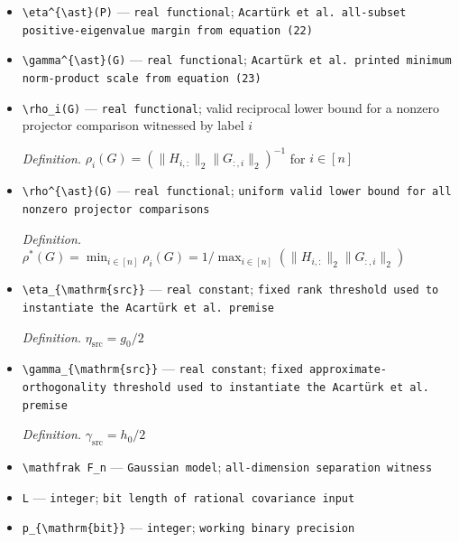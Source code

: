 \documentclass{article}
\begin{document}
\begin{itemize}
  \item \texttt{\textbackslash{}\allowbreak{}eta\textasciicircum{}\{\textbackslash{}\allowbreak{}ast\}\allowbreak{}(P)} --- \texttt{real functional}; \texttt{Acartürk et al. all-\allowbreak{}subset positive-\allowbreak{}eigenvalue margin from equation (22)}
  \item \texttt{\textbackslash{}\allowbreak{}gamma\textasciicircum{}\{\textbackslash{}\allowbreak{}ast\}\allowbreak{}(G)} --- \texttt{real functional}; \texttt{Acartürk et al. printed minimum norm-\allowbreak{}product scale from equation (23)}
  \item \texttt{\textbackslash{}\allowbreak{}rho\_\allowbreak{}i(G)} --- \texttt{real functional}; valid reciprocal lower bound for a nonzero projector comparison witnessed by label \(i\)
  \par\smallskip\noindent\emph{Definition.} \(\rho_i(G)=(\|H_{i,:}\|_2\|G_{:,i}\|_2)^{-1}\) for \(i\in[n]\)
  \item \texttt{\textbackslash{}\allowbreak{}rho\textasciicircum{}\{\textbackslash{}\allowbreak{}ast\}\allowbreak{}(G)} --- \texttt{real functional}; \texttt{uniform valid lower bound for all nonzero projector comparisons}
  \par\smallskip\noindent\emph{Definition.} \(\rho^{\ast}(G)=\min_{i\in[n]}\rho_i(G)=1/\max_{i\in[n]}(\|H_{i,:}\|_2\|G_{:,i}\|_2)\)
  \item \texttt{\textbackslash{}\allowbreak{}eta\_\allowbreak{}\{\textbackslash{}\allowbreak{}mathrm\{src\}\allowbreak{}\}\allowbreak{}} --- \texttt{real constant}; \texttt{fixed rank threshold used to instantiate the Acartürk et al. premise}
  \par\smallskip\noindent\emph{Definition.} \(\eta_{\mathrm{src}}=g_0/2\)
  \item \texttt{\textbackslash{}\allowbreak{}gamma\_\allowbreak{}\{\textbackslash{}\allowbreak{}mathrm\{src\}\allowbreak{}\}\allowbreak{}} --- \texttt{real constant}; \texttt{fixed approximate-\allowbreak{}orthogonality threshold used to instantiate the Acartürk et al. premise}
  \par\smallskip\noindent\emph{Definition.} \(\gamma_{\mathrm{src}}=h_0/2\)
  \item \texttt{\textbackslash{}\allowbreak{}mathfrak F\_\allowbreak{}n} --- \texttt{Gaussian model}; \texttt{all-\allowbreak{}dimension separation witness}
  \item \texttt{L} --- \texttt{integer}; \texttt{bit length of rational covariance input}
  \item \texttt{p\_\allowbreak{}\{\textbackslash{}\allowbreak{}mathrm\{bit\}\allowbreak{}\}\allowbreak{}} --- \texttt{integer}; \texttt{working binary precision}

\end{itemize}
\end{document}
